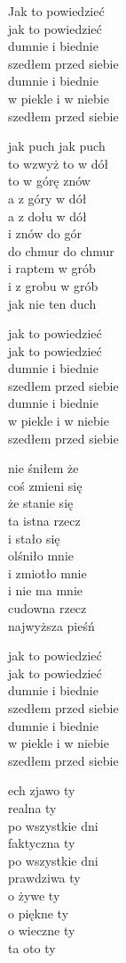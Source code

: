 \begin{text}
	\vin Jak to powiedzieć\\
	\vin jak to powiedzieć\\
	\vin dumnie i biednie\\
	\vin szedłem przed siebie\\
	\vin dumnie i biednie\\
	\vin w piekle i w niebie\\
	\vin szedłem przed siebie

	jak puch jak puch\\
	to wzwyż to w dół\\
	to w górę znów\\
	a z góry w dół\\
	a z dołu w dół\\
	i znów do gór\\
	do chmur do chmur\\
	i raptem w grób\\
	i z grobu w grób\\
	jak nie ten duch

	\vin jak to powiedzieć\\
	\vin jak to powiedzieć\\
	\vin dumnie i biednie\\
	\vin szedłem przed siebie\\
	\vin dumnie i biednie\\
	\vin w piekle i w niebie\\
	\vin szedłem przed siebie

	nie śniłem że\\
	coś zmieni się\\
	że stanie się\\
	ta istna rzecz\\
	i stało się\\
	olśniło mnie\\
	i zmiotło mnie\\
	i nie ma mnie\\
	cudowna rzecz\\
	najwyższa pieśń

	\vin jak to powiedzieć\\
	\vin jak to powiedzieć\\
	\vin dumnie i biednie\\
	\vin szedłem przed siebie\\
	\vin dumnie i biednie\\
	\vin w piekle i w niebie\\
	\vin szedłem przed siebie

	ech zjawo ty\\
	realna ty\\
	po wszystkie dni\\
	faktyczna ty\\
	po wszystkie dni\\
	prawdziwa ty\\
	o żywe ty\\
	o piękne ty\\
	o wieczne ty\\
	ta oto ty 
\end{text}
